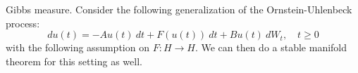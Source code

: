 \documentclass[11pt, a4paper]{memoir}
\theoremstyle{break}
\theoremstyle{break}
\theoremstyle{nonumberplain}
\begin{document}
Gibbs measure.
Consider the following generalization of the Ornstein-Uhlenbeck process:
$$du(t)=-Au(t)\ dt+F(u(t))\ dt+B u(t)\ dW_t,\quad t\geqslant 0$$
with the following assumption on $F:H\to H$. We can then do a stable manifold theorem for this setting as well.
\cite{StableManifoldStoc} 







\end{document}
